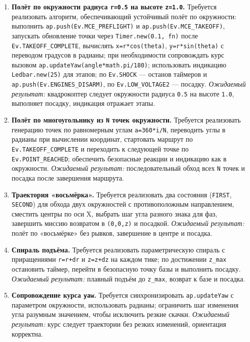 \begin{enumerate}
  \item \textbf{Полёт по окружности радиуса \texttt{r=0.5} на высоте \texttt{z=1.0}.}
    Требуется реализовать алгоритм, обеспечивающий устойчивый полёт по окружности: выполнить \texttt{ap.push(Ev.MCE\_PREFLIGHT)} и \texttt{ap.push(Ev.MCE\_TAKEOFF)}, запускать обновление точки через \texttt{Timer.new(0.1, fn)} после \texttt{Ev.TAKEOFF\_COMPLETE}, вычислять \texttt{x=r*cos(theta)}, \texttt{y=r*sin(theta)} с переводом градусов в радианы; при необходимости сопровождать курс вызовом \texttt{ap.updateYaw(angle*math.pi/180)}; использовать индикацию \texttt{Ledbar.new(25)} для этапов; по \texttt{Ev.SHOCK} — останов таймеров и \texttt{ap.push(Ev.ENGINES\_DISARM)}, по \texttt{Ev.LOW\_VOLTAGE2} — посадку.
    \textit{Ожидаемый результат:} квадрокоптер следует окружности радиуса \texttt{0.5} на высоте \texttt{1.0}, выполняет посадку, индикация отражает этапы.
  \item \textbf{Полёт по многоугольнику из \texttt{N} точек окружности.}
    Требуется реализовать генерацию точек по равномерным углам \texttt{a=360*i/N}, переводить углы в радианы при вычислении координат, стартовать маршрут по \texttt{Ev.TAKEOFF\_COMPLETE} и переходить к следующей точке по \texttt{Ev.POINT\_REACHED}; обеспечить безопасные реакции и индикацию как в окружности.
    \textit{Ожидаемый результат:} последовательный обход всех \texttt{N} точек и посадка после завершения маршрута.
  \item \textbf{Траектория «восьмёрка».}
    Требуется реализовать два состояния (\texttt{FIRST}, \texttt{SECOND}) для обхода двух окружностей с противоположным направлением, сместить центры по оси X, выбрать шаг угла разного знака для фаз, завершить миссию возвратом в \texttt{(0,0,z)} и посадкой.
    \textit{Ожидаемый результат:} полёт по «восьмёрке» без рывков, завершение в центре и посадка.
  \item \textbf{Спираль подъёма.}
    Требуется реализовать параметрическую спираль с приращениями \texttt{r=r+dr} и \texttt{z=z+dz} на каждом тике; по достижении \texttt{z\_max} остановить таймер, перейти в безопасную точку базы и выполнить посадку.
    \textit{Ожидаемый результат:} плавный подъём до \texttt{z\_max}, возврат к базе и посадка.
  \item \textbf{Сопровождение курса \texttt{yaw}.}
    Требуется синхронизировать \texttt{ap.updateYaw} с параметром окружности, использовать радианы; ограничить шаг изменения угла разумным значением, чтобы исключить резкие скачки.
    \textit{Ожидаемый результат:} курс следует траектории без резких изменений, ориентация корректна.

\end{enumerate}

